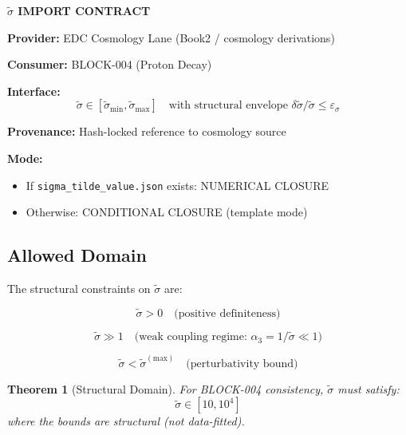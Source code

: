\documentclass[11pt,letterpaper]{article}
\newtheorem{theorem}{Theorem}[section]
\newcommand{\st}{\tilde{\sigma}}
\newcommand{\stmin}{\tilde{\sigma}_{\min}}
\newcommand{\stmax}{\tilde{\sigma}_{\max}}
\newcommand{\eps}{\varepsilon}
\begin{document}
\begin{importbox}
\textbf{$\tilde{\sigma}$ IMPORT CONTRACT}

\textbf{Provider:} EDC Cosmology Lane (Book2 / cosmology derivations)

\textbf{Consumer:} BLOCK-004 (Proton Decay)

\textbf{Interface:}
\begin{equation}
\st \in [\stmin, \stmax] \quad \text{with structural envelope } \delta\st/\st \leq \eps_\sigma
\label{eq:sigma-domain}
\end{equation}

\textbf{Provenance:} Hash-locked reference to cosmology source

\textbf{Mode:}
\begin{itemize}[noitemsep]
\item If \texttt{sigma\_tilde\_value.json} exists: NUMERICAL CLOSURE
\item Otherwise: CONDITIONAL CLOSURE (template mode)
\end{itemize}
\end{importbox}

\subsection{Allowed Domain}
\label{subsec:allowed-domain}

The structural constraints on $\st$ are:

\begin{equation}
\st > 0 \quad \text{(positive definiteness)}
\label{eq:sigma-positive}
\end{equation}

\begin{equation}
\st \gg 1 \quad \text{(weak coupling regime: } \alpha_3 = 1/\st \ll 1\text{)}
\label{eq:sigma-weak-coupling}
\end{equation}

\begin{equation}
\st < \st^{(\text{max})} \quad \text{(perturbativity bound)}
\label{eq:sigma-max-bound}
\end{equation}

\begin{theorem}[Structural Domain]
\label{thm:structural-domain}
For BLOCK-004 consistency, $\st$ must satisfy:
\begin{equation}
\st \in [10, 10^4]
\label{eq:sigma-range}
\end{equation}
where the bounds are structural (not data-fitted).
\end{theorem}
\end{document}
